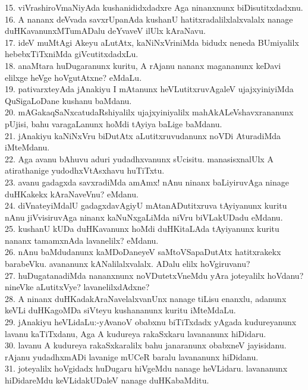\documentclass{article}
\begin{document}
15. viVrashiroVmaNiyAda kushanididxdadxre Aga ninanxnunx biDisutitxdadxnu.\\
16. A nananx deVvada savxrUpanAda kushanU hatitxradalilxlalxvalalx nanage duHKavanunxMTumADalu deYvaveV ilUlx kAraNavu.\\
17. ideV muMtAgi Akeyu aLutAtx, kaNiNxVriniMda bidudx neneda BUmiyalilx hebebxTiTxniMda giVcutitxdadxLu.\\
18. anaMtara huDugaranunx kuritu, A rAjanu nananx magananunx keDavi elilxge heVge hoVgutAtxne? eMdaLu.\\
19. pativarxteyAda jAnakiyu I mAtanunx heVLutitxruvAgaleV ujajxyiniyiMda QuSigaLoDane kushanu baMdanu.\\
20. mAGakaqSaNxcatudaRshiyalilx ujajxyiniyalilx mahAkALeVshavxrananunx pUjisi, bahu varagaLanunx hoMdi tAyiya baLige baMdanu.\\
21. jAnakiyu kaNiNxVru biDutAtx aLutitxruvudanunx noVDi AturadiMda iMteMdanu.\\
22. Aga avanu bAhuvu aduri yudadhxvanunx sUcisitu. manasisxnalUlx A atirathanige yudodhxVtAsxhavu huTiTxtu.\\
23. avanu gadagxda savxradiMda amAmx! nAnu ninanx baLiyiruvAga ninage duHKakekx kAraNaveVnu? eMdanu.\\
24. diVnateyiMdalU gadagxdavAgiyU mAtanADutitxruva tAyiyanunx kuritu nAnu jiVvisiruvAga ninanx kaNuNxgaLiMda niVru biVLakUDadu eMdanu.\\
25. kushanU kUDa duHKavanunx hoMdi duHKitaLAda tAyiyanunx kuritu nananx tamamxnAda lavanelilx? eMdanu.\\
26. nAnu baMdudanunx kaMDoDaneyeV saMtoVSapaDutAtx hatitxrakekx barabeVku. avananunx kANalilalxvalalx. ADalu elilx hoVgiruvanu?\\
27. huDugatanadiMda nananxnunx noVDutetxVneMdu yAra joteyalilx hoVdanu? nineVke aLutitxVye? lavanelilxdAdxne?\\
28. A ninanx duHKadakAraNavelalxvanUnx nanage tiLisu enanxlu, adanunx  keVLi duHKagoMDa siVteyu kushananunx kuritu iMteMdaLu.\\
29. jAnakiyu heVLidaLu:-yAvanoV obabxnu biTiTxdadx yAgada kudureyanunx lavanu kaTiTxdanu, Aga A kudureya rakaSxkaru lavananunx hiDidaru.\\
30. lavanu A kudureya rakaSxkaralilx bahu janaranunx obabxneV jayisidanu. rAjanu yudadhxmADi lavanige mUCeR baralu lavananunx hiDidanu.\\
31. joteyalilx hoVgidadx huDugaru hiVgeMdu nanage heVLidaru. lavananunx hiDidareMdu keVLidakUDaleV nanage duHKabaMditu.\\
\end{document}
